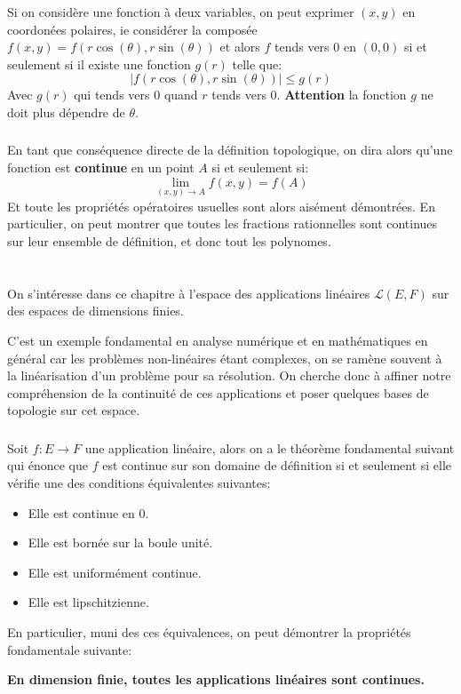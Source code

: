 \subsection*{}
Si on considère une fonction à deux variables, on peut exprimer \((x, y)\) en coordonées polaires, ie considérer la composée \(f(x, y) = f(r\cos(\theta), r\sin(\theta))\) et alors \(f\) tends vers \(0\) en \((0, 0)\) si et seulement si il existe une fonction \(g(r)\) telle que:
\[
   |f(r\cos(\theta), r\sin(\theta))| \leq g(r)
\]
Avec \(g(r)\) qui tends vers \(0\) quand \(r\) tends vers \(0\). \textbf{Attention} la fonction \(g\) ne doit plus dépendre de \(\theta\).
\subsection*{}
En tant que conséquence directe de la définition topologique, on dira alors qu'une fonction est \textbf{continue} en un point \(A\) si et seulement si:
\[
   \lim_{(x, y) \rightarrow A} f(x, y) = f(A)   
\]
Et toute les propriétés opératoires usuelles sont alors aisément démontrées. En particulier, on peut montrer que toutes les fractions rationnelles sont continues sur leur ensemble de définition, et donc tout les polynomes.

\chapter*{}
On s'intéresse dans ce chapitre à l'espace des applications linéaires \(\mathcal{L}(E, F)\) sur des espaces de dimensions finies. \<

C'est un exemple fondamental en analyse numérique et en mathématiques en général car les problèmes non-linéaires étant complexes, on se ramène souvent à la linéarisation d'un problème pour sa résolution. On cherche donc à affiner notre compréhension de la continuité de ces applications et poser quelques bases de topologie sur cet espace.
\subsection*{}
Soit \(f : E \rightarrow F\) une application linéaire, alors on a le théorème fondamental suivant qui énonce que \(f\) est continue sur son domaine de définition si et seulement si elle vérifie une des conditions équivalentes suivantes:
\begin{itemize}
   \item Elle est continue en 0.
   \item Elle est bornée sur la boule unité.
   \item Elle est uniformément continue.
   \item Elle est lipschitzienne.
\end{itemize}
En particulier, muni des ces équivalences, on peut démontrer la propriétés fondamentale suivante:
\begin{center}
   \textbf{En dimension finie, toutes les applications linéaires sont continues.}
\end{center}

